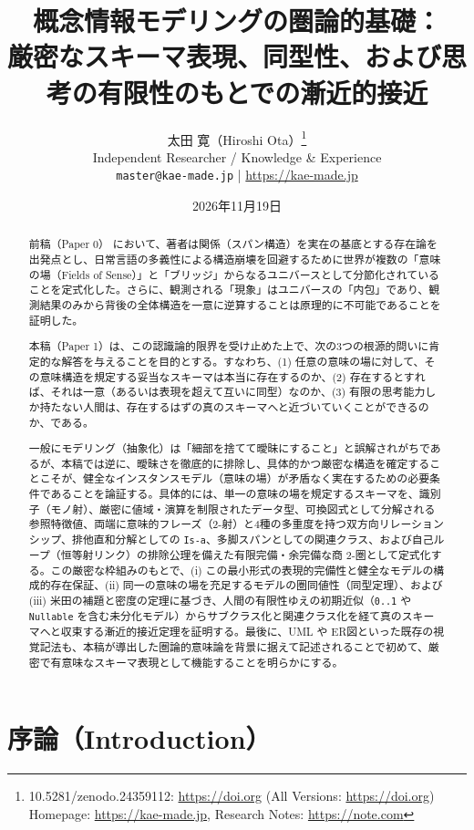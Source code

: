 \documentclass[11pt,a4paper]{ltjsarticle}
\title{\textbf{概念情報モデリングの圏論的基礎：\\
厳密なスキーマ表現、同型性、および思考の有限性のもとでの漸近的接近}}
\author{太田 寛（Hiroshi Ota）\thanks{10.5281/zenodo.24359112: \url{https://doi.org} (All Versions: \url{https://doi.org}) \\ Homepage: \url{https://kae-made.jp}, Research Notes: \url{https://note.com}} \\
\small Independent Researcher / Knowledge \& Experience\\
\small \texttt{master@kae-made.jp} \quad | \quad \url{https://kae-made.jp}}
\date{2026年11月19日}
\theoremstyle{definition}
\theoremstyle{plain}
\theoremstyle{remark}
\begin{document}
\maketitle

\begin{abstract}
前稿（Paper 0）\cite{ota2026paper0} において、著者は関係（スパン構造）を実在の基底とする存在論を出発点とし、日常言語の多義性による構造崩壊を回避するために世界が複数の「意味の場（Fields of Sense）」と「ブリッジ」からなるユニバースとして分節化されていることを定式化した。さらに、観測される「現象」はユニバースの「内包」であり、観測結果のみから背後の全体構造を一意に逆算することは原理的に不可能であることを証明した。

本稿（Paper 1）は、この認識論的限界を受け止めた上で、次の3つの根源的問いに肯定的な解答を与えることを目的とする。すなわち、(1) 任意の意味の場に対して、その意味構造を規定する妥当なスキーマは本当に存在するのか、(2) 存在するとすれば、それは一意（あるいは表現を超えて互いに同型）なのか、(3) 有限の思考能力しか持たない人間は、存在するはずの真のスキーマへと近づいていくことができるのか、である。

一般にモデリング（抽象化）は「細部を捨てて曖昧にすること」と誤解されがちであるが、本稿では逆に、曖昧さを徹底的に排除し、具体的かつ厳密な構造を確定することこそが、健全なインスタンスモデル（意味の場）が矛盾なく実在するための必要条件であることを論証する。具体的には、単一の意味の場を規定するスキーマを、識別子（モノ射）、厳密に値域・演算を制限されたデータ型、可換図式として分解される参照特徴値、両端に意味的フレーズ（2-射）と4種の多重度を持つ双方向リレーションシップ、排他直和分解としての \texttt{Is-a}、多脚スパンとしての関連クラス、および自己ループ（恒等射リンク）の排除公理を備えた有限完備・余完備な商 2-圏として定式化する。この厳密な枠組みのもとで、(i) この最小形式の表現的完備性と健全なモデルの構成的存在保証、(ii) 同一の意味の場を充足するモデルの圏同値性（同型定理）、および (iii) 米田の補題と密度の定理に基づき、人間の有限性ゆえの初期近似（\texttt{0..1} や \texttt{Nullable} を含む未分化モデル）からサブクラス化と関連クラス化を経て真のスキーマへと収束する漸近的接近定理を証明する。最後に、UML や ER図といった既存の視覚記法も、本稿が導出した圏論的意味論を背景に据えて記述されることで初めて、厳密で有意味なスキーマ表現として機能することを明らかにする。
\end{abstract}

\section{序論（Introduction）}
\end{document}
